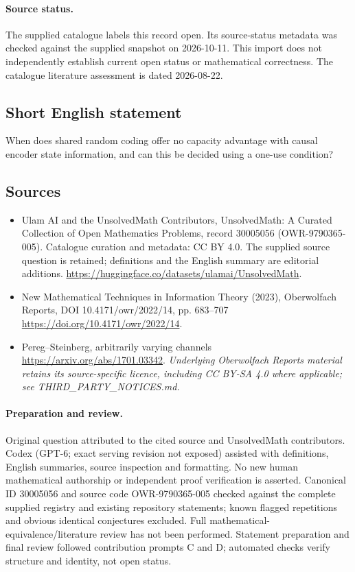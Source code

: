 \documentclass[11pt]{article}
\begin{document}
\paragraph{Source status.}
The supplied catalogue labels this record open. Its source-status metadata was checked against the supplied snapshot on 2026-10-11. This import does not independently establish current open status or mathematical correctness. The catalogue literature assessment is dated 2026-08-22.
\subsection{Short English statement}
When does shared random coding offer no capacity advantage with causal encoder state information, and can this be decided using a one-use condition?
\subsection{Sources}
\begin{itemize}
\item[\hypertarget{source:30005056:1}{S1}] Ulam AI and the UnsolvedMath Contributors, UnsolvedMath: A Curated Collection of Open Mathematics Problems, record 30005056 (OWR-9790365-005). Catalogue curation and metadata: CC BY 4.0. The supplied source question is retained; definitions and the English summary are editorial additions.
\url{https://huggingface.co/datasets/ulamai/UnsolvedMath}.
\item[\hypertarget{source:30005056:2}{S2}] New Mathematical Techniques in Information Theory (2023), Oberwolfach Reports, DOI 10.4171/owr/2022/14, pp. 683--707
\url{https://doi.org/10.4171/owr/2022/14}.
\item[\hypertarget{source:30005056:3}{S3}] Pereg--Steinberg, arbitrarily varying channels
\url{https://arxiv.org/abs/1701.03342}.
\textit{Underlying Oberwolfach Reports material retains its source-specific licence, including CC BY-SA 4.0 where applicable; see THIRD\_PARTY\_NOTICES.md.}
\end{itemize}
\paragraph{Preparation and review.}
Original question attributed to the cited source and UnsolvedMath contributors. Codex (GPT-6; exact serving revision not exposed) assisted with definitions, English summaries, source inspection and formatting. No new human mathematical authorship or independent proof verification is asserted. Canonical ID 30005056 and source code OWR-9790365-005 checked against the complete supplied registry and existing repository statements; known flagged repetitions and obvious identical conjectures excluded. Full mathematical-equivalence/literature review has not been performed. Statement preparation and final review followed contribution prompts C and D; automated checks verify structure and identity, not open status.
\label{end:30005056}
\end{document}

